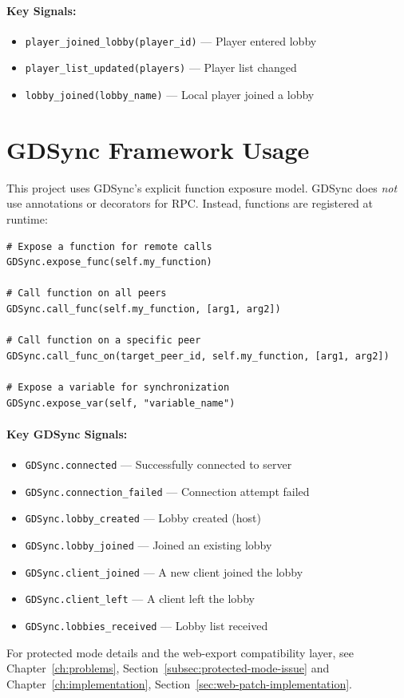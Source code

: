 \paragraph*{Key Signals:}
\begin{itemize}
    \item \texttt{player\_joined\_lobby(player\_id)} --- Player entered lobby
    \item \texttt{player\_list\_updated(players)} --- Player list changed
    \item \texttt{lobby\_joined(lobby\_name)} --- Local player joined a lobby
\end{itemize}

\section{GDSync Framework Usage}
\label{app:c:gdsync-usage}

This project uses GDSync's explicit function exposure model. GDSync does \emph{not} use annotations or decorators for RPC. Instead, functions are registered at runtime:

\begin{lstlisting}[style={gdscript}, caption={GDSync function exposure (actual API)}]
# Expose a function for remote calls
GDSync.expose_func(self.my_function)

# Call function on all peers
GDSync.call_func(self.my_function, [arg1, arg2])

# Call function on a specific peer
GDSync.call_func_on(target_peer_id, self.my_function, [arg1, arg2])

# Expose a variable for synchronization
GDSync.expose_var(self, "variable_name")
\end{lstlisting}

\paragraph*{Key GDSync Signals:}
\begin{itemize}
    \item \texttt{GDSync.connected} --- Successfully connected to server
    \item \texttt{GDSync.connection\_failed} --- Connection attempt failed
    \item \texttt{GDSync.lobby\_created} --- Lobby created (host)
    \item \texttt{GDSync.lobby\_joined} --- Joined an existing lobby
    \item \texttt{GDSync.client\_joined} --- A new client joined the lobby
    \item \texttt{GDSync.client\_left} --- A client left the lobby
    \item \texttt{GDSync.lobbies\_received} --- Lobby list received
\end{itemize}

\noindent For protected mode details and the web-export compatibility layer, see Chapter~\ref{ch:problems}, Section~\ref{subsec:protected-mode-issue} and Chapter~\ref{ch:implementation}, Section~\ref{sec:web-patch-implementation}.

